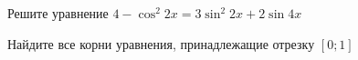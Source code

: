 \begin{ex}
	\begin{condition}
		\begin{enumcols}[label=\asbuk*)]
			\item Решите уравнение \( 4-\cos^2 2x = 3\sin^2 2x + 2\sin 4x \)
			\item Найдите все корни уравнения, принадлежащие отрезку \( \left[0;1\right] \)
		\end{enumcols}
	\end{condition}
\end{ex}